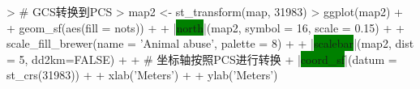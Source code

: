 \begin{frame}[t,fragile]{\subsecname}{\subsubsecname}
\begin{overlayarea}{\textwidth}{\textheight}
\begin{onlyenv}
\begin{columns}
\begin{column}{.6\textwidth}
\centering
\begin{rcode}
> # GCS转换到PCS
> map2 <- st_transform(map, 31983)
> ggplot(map2) +
+     geom_sf(aes(fill = nots)) +
+     |\colorbox{green}{north}|(map2, symbol = 16, scale = 0.15) +
+     scale_fill_brewer(name = 'Animal abuse\nnotifications', palette = 8) +
+     |\colorbox{green}{scalebar}|(map2, dist = 5, dd2km=FALSE) +
+     # 坐标轴按照PCS进行转换
+     |\colorbox{green}{coord\_sf}|(datum = st_crs(31983)) + 
+     xlab('Meters') +
+     ylab('Meters')
\end{rcode}
\end{column}
\end{columns}
\end{onlyenv}
\end{overlayarea}
\end{frame}

